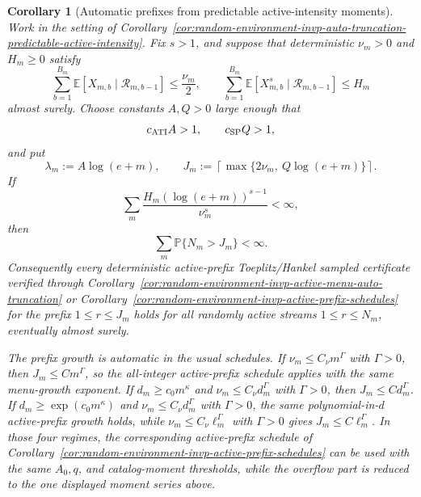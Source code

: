 \documentclass[11pt]{amsart}
\numberwithin{equation}{section}
\newtheorem{corollary}[theorem]{Corollary}
\theoremstyle{definition}
\theoremstyle{remark}
\newcommand{\Prob}{\mathbb P}
\newcommand{\Exp}{\mathbb E}
\begin{document}
\begin{corollary}[Automatic prefixes from predictable active-intensity moments]
\label{cor:random-environment-invp-auto-prefix-predictable-active-intensity}
Work in the setting of
Corollary~\ref{cor:random-environment-invp-auto-truncation-predictable-active-intensity}.
Fix \(s>1\), and suppose that deterministic \(\nu_m>0\) and \(H_m\ge0\)
satisfy
\[
  \sum_{b=1}^{B_m}
  \Exp[X_{m,b}\mid\mathcal R_{m,b-1}]\le\frac{\nu_m}{2},
  \qquad
  \sum_{b=1}^{B_m}
  \Exp[X_{m,b}^s\mid\mathcal R_{m,b-1}]\le H_m
\]
almost surely.  Choose constants \(A,Q>0\) large enough that
\[
  c_{\rm ATI}A>1,\qquad c_{\rm SP}Q>1,
\]
and put
\[
  \lambda_m:=A\log(e+m),
  \qquad
  J_m:=\left\lceil\max\{2\nu_m,\ Q\log(e+m)\}\right\rceil .
\]
If
\[
  \sum_m
  \frac{H_m(\log(e+m))^{s-1}}{\nu_m^s}<\infty,
\]
then
\[
  \sum_m\Prob\{N_m>J_m\}<\infty .
\]
Consequently every deterministic active-prefix Toeplitz/Hankel sampled
certificate verified through
Corollary~\ref{cor:random-environment-invp-active-menu-auto-truncation} or
Corollary~\ref{cor:random-environment-invp-active-prefix-schedules} for the
prefix \(1\le r\le J_m\) holds for all randomly active streams
\(1\le r\le N_m\), eventually almost surely.

The prefix growth is automatic in the usual schedules.  If
\(\nu_m\le C_\nu m^\Gamma\) with \(\Gamma>0\), then \(J_m\le C m^\Gamma\), so
the all-integer active-prefix schedule applies with the same menu-growth
exponent.  If \(d_m\ge c_0m^\kappa\) and
\(\nu_m\le C_\nu d_m^\Gamma\) with \(\Gamma>0\), then
\(J_m\le C d_m^\Gamma\).  If
\(d_m\ge\exp(c_0m^\kappa)\) and \(\nu_m\le C_\nu d_m^\Gamma\) with
\(\Gamma>0\), the same
polynomial-in-\(d\) active-prefix growth holds, while
\(\nu_m\le C_\nu\ell_m^\Gamma\) with \(\Gamma>0\) gives
\(J_m\le C\ell_m^\Gamma\).  In those four regimes, the corresponding
active-prefix schedule of
Corollary~\ref{cor:random-environment-invp-active-prefix-schedules} can be used
with the same \(A_0,q\), and catalog-moment thresholds, while the overflow
part is reduced to the one displayed moment series above.
\end{corollary}
\end{document}
